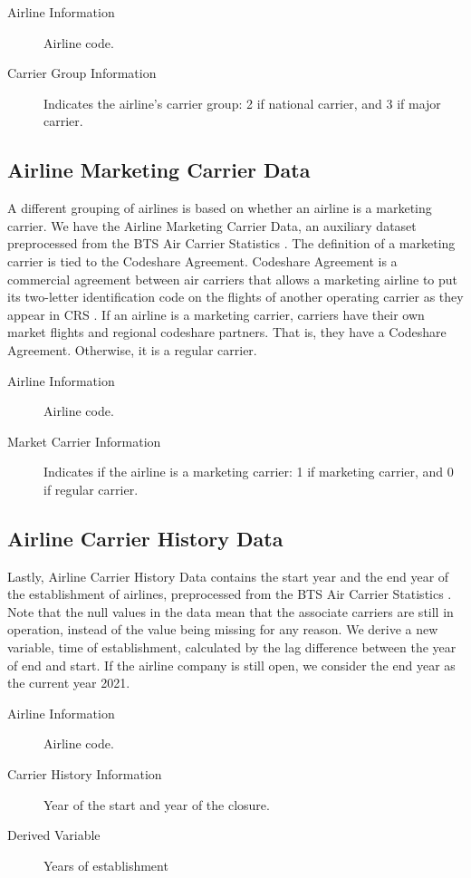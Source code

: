 \documentclass[11pt]{article}
\begin{document}
\begin{description}
\item [Airline Information] Airline code.
\item [Carrier Group Information] Indicates the airline's carrier group: 2 if national carrier, and 3 if major carrier.
\end{description}

\subsection{Airline Marketing Carrier Data}
A different grouping of airlines is based on whether an airline is a marketing carrier. We have the Airline Marketing Carrier Data, an auxiliary dataset preprocessed from the BTS Air Carrier Statistics \citep{web:bts4}. The definition of a marketing carrier is tied to the Codeshare Agreement. Codeshare Agreement is a commercial agreement between air carriers that allows a marketing airline to put its two-letter identification code on the flights of another operating carrier as they appear in CRS \citep{web:bts3}. If an airline is a marketing carrier, carriers have their own market flights and regional codeshare partners. That is, they have a Codeshare Agreement. Otherwise, it is a regular carrier.

\begin{description}
\item [Airline Information] Airline code.
\item [Market Carrier Information] Indicates if the airline is a marketing carrier: 1 if marketing carrier, and 0 if regular carrier. 
\end{description}

\subsection{Airline Carrier History Data}\label{sec:hist}
Lastly, Airline Carrier History Data contains the start year and the end year of the establishment of airlines, preprocessed from the BTS Air Carrier Statistics \citep{web:bts4}. Note that the null values in the data mean that the associate carriers are still in operation, instead of the value being missing for any reason. We derive a new variable, time of establishment, calculated by the lag difference between the year of end and start. If the airline company is still open, we consider the end year as the current year 2021.

\begin{description}
\item [Airline Information] Airline code.
\item [Carrier History Information] Year of the start and year of the closure.
\item [Derived Variable] Years of establishment
\end{description}
\end{document}
